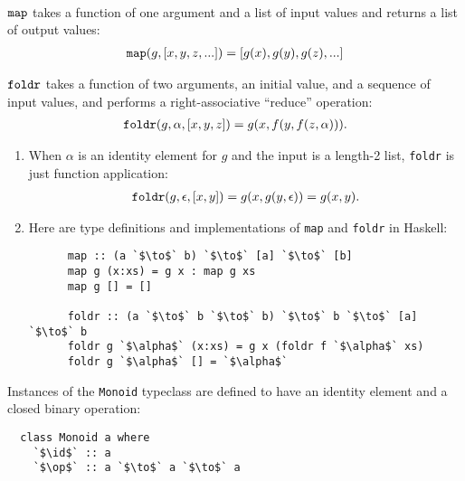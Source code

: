 \documentclass[12pt]{article}
\begin{document}
\begin{definition*}[$\map$, $\foldr$]\hspace{0pt}\\
  $\map$ takes a function of one argument and a list of input values and returns a list of output
  values:
  \begin{align*}
    \text{{\tt map}}(g, [x, y, z, ...]) = [g(x), g(y), g(z), ...]
  \end{align*}

  $\foldr$ takes a function of two arguments, an initial value, and a sequence of input values, and
  performs a right-associative ``reduce'' operation:
  \begin{align*}
    \text{{\tt foldr}}(g, \alpha, [x, y, z]) = g(x, f(y, f(z, \alpha))).
  \end{align*}
\end{definition*}

\begin{remark*}\hspace{0pt}
  \begin{enumerate}
  \item When $\alpha$ is an identity element for $g$ and the input is a length-2 list, {\tt foldr}
    is just function application:
  \begin{align*}
    \text{{\tt foldr}}(g, \epsilon, [x, y]) = g(x, g(y, \epsilon)) = g(x, y).
  \end{align*}
\item   Here are type definitions and implementations of {\tt map} and {\tt foldr} in Haskell:
  \begin{normalfont}
    \begin{verbatim}
      map :: (a `$\to$` b) `$\to$` [a] `$\to$` [b]
      map g (x:xs) = g x : map g xs
      map g [] = []

      foldr :: (a `$\to$` b `$\to$` b) `$\to$` b `$\to$` [a] `$\to$` b
      foldr g `$\alpha$` (x:xs) = g x (foldr f `$\alpha$` xs)
      foldr g `$\alpha$` [] = `$\alpha$`
    \end{verbatim}
  \end{normalfont}
  \end{enumerate}
\end{remark*}

Instances of the {\tt Monoid} typeclass are defined to have an identity element and a closed binary
operation:
\begin{verbatim}
  class Monoid a where
    `$\id$` :: a
    `$\op$` :: a `$\to$` a `$\to$` a
\end{verbatim}
\end{document}
